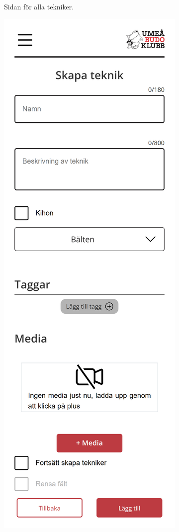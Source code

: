 \documentclass{article}
\begin{document}
{\begin{figure}[h]
{\begin{subfigure}[b]{0.25\textwidth}
                     \caption{Sidan för alla tekniker.}
                     \label{fig:technique}
                \end{subfigure}
                \hfill
                \begin{subfigure}[b]{0.25\textwidth}
                     \centering
                     \includegraphics[width=\textwidth]{images/Screens/TechniqueCreate.png}

\end{subfigure}}
\end{figure}}
\end{document}
